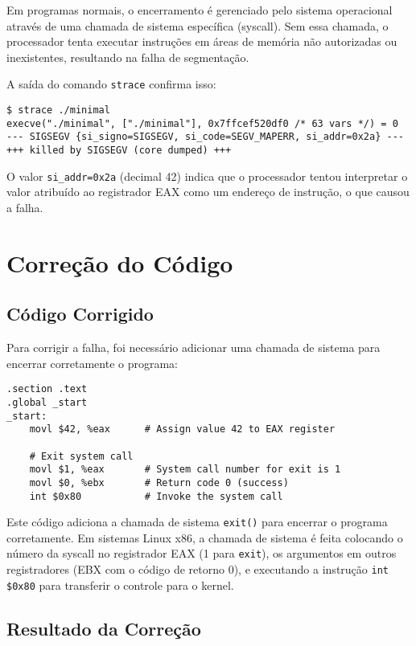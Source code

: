 \documentclass[12pt,a4paper]{article}
\begin{document}
Em programas normais, o encerramento é gerenciado pelo sistema operacional através de uma chamada de sistema específica (syscall). Sem essa chamada, o processador tenta executar instruções em áreas de memória não autorizadas ou inexistentes, resultando na falha de segmentação.

A saída do comando \texttt{strace} confirma isso:

\begin{verbatim}
$ strace ./minimal
execve("./minimal", ["./minimal"], 0x7ffcef520df0 /* 63 vars */) = 0
--- SIGSEGV {si_signo=SIGSEGV, si_code=SEGV_MAPERR, si_addr=0x2a} ---
+++ killed by SIGSEGV (core dumped) +++
\end{verbatim}

O valor \texttt{si\_addr=0x2a} (decimal 42) indica que o processador tentou interpretar o valor atribuído ao registrador EAX como um endereço de instrução, o que causou a falha.

\section{Correção do Código}

\subsection{Código Corrigido}

Para corrigir a falha, foi necessário adicionar uma chamada de sistema para encerrar corretamente o programa:

\begin{verbatim}
.section .text
.global _start
_start:
    movl $42, %eax      # Assign value 42 to EAX register
    
    # Exit system call
    movl $1, %eax       # System call number for exit is 1
    movl $0, %ebx       # Return code 0 (success)
    int $0x80           # Invoke the system call
\end{verbatim}

Este código adiciona a chamada de sistema \texttt{exit()} para encerrar o programa corretamente. Em sistemas Linux x86, a chamada de sistema é feita colocando o número da syscall no registrador EAX (1 para \texttt{exit}), os argumentos em outros registradores (EBX com o código de retorno 0), e executando a instrução \texttt{int \$0x80} para transferir o controle para o kernel.

\subsection{Resultado da Correção}
\end{document}
